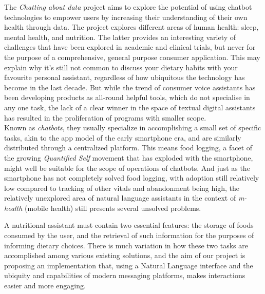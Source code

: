 The \textit{Chatting about data} project aims to explore the potential of using chatbot technologies to empower users by increasing their understanding of their own health through data. The project explores different areas of human health: sleep, mental health, and nutrition. The latter provides an interesting variety of challenges that have been explored in academic and clinical trials, but never for the purpose of a comprehensive, general purpose consumer application. This may explain why it’s still not common to discuss your dietary habits with your favourite personal assistant, regardless of how ubiquitous the technology has become in the last decade. But while the trend of consumer voice assistants has been developing products as all-round helpful tools, which do not specialise in any one task, the lack of a clear winner in the space of textual digital assistants has resulted in the proliferation of programs with smaller scope.\\
Known as \textit{chatbots}, they usually specialize in accomplishing a small set of specific tasks, akin to the app model of the early smartphone era, and are similarly distributed through a centralized platform. This means food logging, a facet of the growing \textit{Quantified Self} movement that has exploded with the smartphone, might well be suitable for the scope of operations of chatbots. And just as the smartphone has not completely solved food logging, with adoption still relatively low compared to tracking of other vitals and abandonment being high, the relatively unexplored area of natural language assistants in the context of \textit{m-health} (mobile health) still presents several unsolved problems.

A nutritional assistant must contain two essential features: the storage of foods consumed by the user, and the retrieval of such information for the purposes of informing dietary choices. There is much variation in how these two tasks are accomplished among various existing solutions, and the aim of our project is proposing an implementation that, using a Natural Language interface and the ubiquity and capabilities of modern messaging platforms, makes interactions easier and more engaging.

